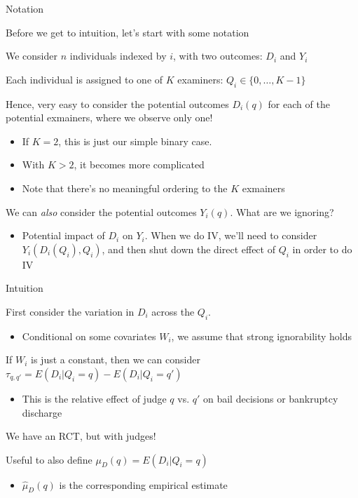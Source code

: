 \documentclass[notes,11pt, aspectratio=169]{beamer}
\newenvironment{wideitemize}{\itemize\addtolength{\itemsep}{10pt}}{\enditemize}
\begin{document}
\begin{frame}{Notation}
  \begin{wideitemize}
  \item Before we get to intuition, let's start with some notation
  \item We consider $n$ individuals indexed by $i$, with two outcomes: $D_{i}$  and $Y_{i}$
  \item Each individual is assigned to one of $K$ examiners: $Q_{i} \in \{0, \ldots, K-1\}$
  \item Hence, very easy to consider the potential outcomes $D_{i}(q)$
    for each of the potential exmainers, where we observe only one!
    \begin{itemize}
    \item If $K=2$, this is just our simple binary case.
    \item With  $K > 2$, it becomes more complicated
    \item Note that there's no meaningful ordering to the $K$ exmainers 
    \end{itemize}
  \item We can \emph{also} consider the potential outcomes $Y_{i}(q)$. What are we ignoring?
    \pause
    \begin{itemize}
    \item Potential impact of $D_{i}$ on $Y_{i}$. When we do IV, we'll
      need to consider $Y_{i}(D_{i}(Q_{i}), Q_{i})$, and then shut
      down the direct effect of $Q_{i}$ in order to do IV
    \end{itemize}
  \end{wideitemize}
\end{frame}

\begin{frame}{Intuition}
  \begin{wideitemize}
  \item First consider the variation in $D_{i}$ across the $Q_{i}$.
    \begin{itemize}
    \item Conditional on some covariates $W_{i}$, we assume that
      strong ignorability holds
    \end{itemize}
  \item If $W_{i}$ is just a constant, then we can consider
    $\tau_{q, q'} = E(D_{i} | Q_{i} = q) - E(D_{i} | Q_{i} = q')$
    \begin{itemize}
    \item This is the relative effect of judge $q$ vs. $q'$ on bail
      decisions or bankruptcy discharge 
    \end{itemize}
  \item We have an RCT, but with judges!
  \item Useful to also define $\mu_{D}(q) = E(D_{i}| Q_{i} = q)$
    \begin{itemize}
    \item     $\hat{\mu}_{D}(q)$ is the corresponding empirical estimate
    \end{itemize}
  \end{wideitemize}
\end{frame}
\end{document}

